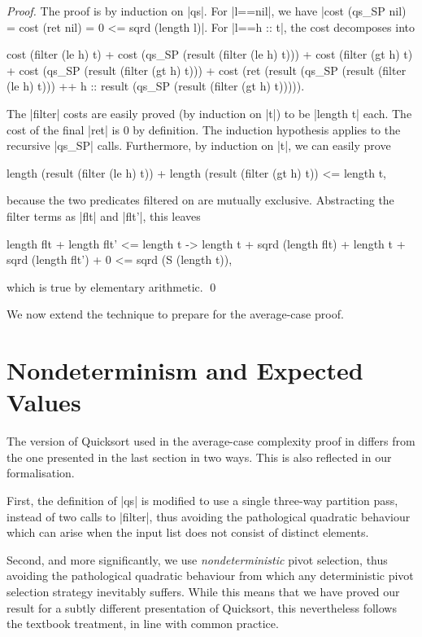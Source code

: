 \documentclass[runningheads]{llncs}
\begin{document}
\begin{proof}
  The proof is by induction on |qs|. For |l==nil|, we have {|cost (qs_SP nil) = cost (ret nil) = 0 <= sqrd (length l)|}. For |l==h :: t|, the cost decomposes into
  \begin{code}
    cost (filter (le h) t) + cost (qs_SP (result (filter (le h) t))) +
    cost (filter (gt h) t) + cost (qs_SP (result (filter (gt h) t))) +
    cost (ret (result (qs_SP (result (filter (le h) t))) ++
     h :: result (qs_SP (result (filter (gt h) t))))).
  \end{code}
  The |filter| costs are easily proved (by induction on |t|) to be |length t| each. The cost of the final |ret| is 0 by definition. The induction hypothesis applies to the recursive |qs_SP| calls. Furthermore, by induction on |t|, we can easily prove
  \begin{code}
  length (result (filter (le h) t)) + length (result (filter (gt h) t)) <= length t,
  \end{code}
  because the two predicates filtered on are mutually exclusive. Abstracting the filter terms as |flt| and |flt'|, this leaves
  \begin{code}
    length flt + length flt' <= length t ->
      length t + sqrd (length flt) + length t + sqrd (length flt') + 0 <= sqrd (S (length t)),
  \end{code}
  which is true by elementary arithmetic. \qed
\end{proof}

We now extend the technique to prepare for the average-case proof.

\section{Nondeterminism and Expected Values}
\label{nondetexpec}


The version of Quicksort used in the average-case complexity proof in \cite{introtoalgos}
differs from the one presented in the last section in two ways. This is also
reflected in our formalisation.  

First, the definition of |qs| is modified to use a single three-way partition
pass, instead of two calls to |filter|, thus avoiding the pathological
quadratic behaviour which can arise when the input list does not consist of
distinct elements.

Second, and more significantly, we use \emph{nondeterministic} pivot
selection, thus avoiding the pathological quadratic behaviour from which
any deterministic pivot selection strategy inevitably suffers. While this
means that we have proved our result for a subtly different presentation of
Quicksort, this nevertheless follows the textbook treatment, in line with
common practice.
\end{document}
